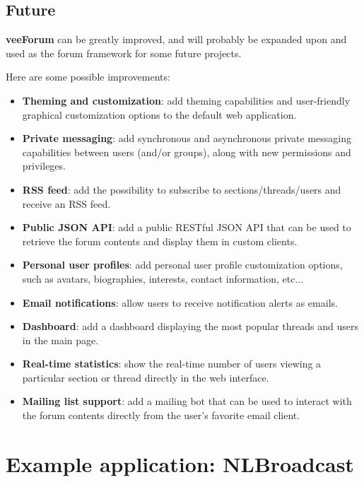 \documentclass[12pt]{report}
\newcommand{\+}{\discretionary{\mbox{\scriptsize$\hookleftarrow$}}{}{}}
\renewcommand\emph{\textbf}
\begin{document}
    \chapter{Future}
        
        \emph{veeForum} can be greatly improved, and will probably be expanded upon and used as the forum framework for some future projects.

            Here are some possible improvements:

            \begin{itemize}
                \item \emph{Theming and customization}: add theming capabilities and user-friendly graphical customization options to the default web application.
                \item \emph{Private messaging}: add synchronous and asynchronous private messaging capabilities between users (and/or groups), along with new permissions and privileges.
                \item \emph{RSS feed}: add the possibility to subscribe to sections/threads/users and receive an RSS feed.
                \item \emph{Public JSON API}: add a public RESTful JSON API that can be used to retrieve the forum contents and display them in custom clients.
                \item \emph{Personal user profiles}: add personal user profile customization options, such as avatars, biographies, interests, contact information, etc...
                \item \emph{Email notifications}: allow users to receive notification alerts as emails.
                \item \emph{Dashboard}: add a dashboard displaying the most popular threads and users in the main page.
                \item \emph{Real-time statistics}: show the real-time number of users viewing a particular section or thread directly in the web interface.
                \item \emph{Mailing list support}: add a mailing bot that can be used to interact with the forum contents directly from the user's favorite email client.
            \end{itemize}




\part{Example application: NLBroadcast}
    
\end{document}
